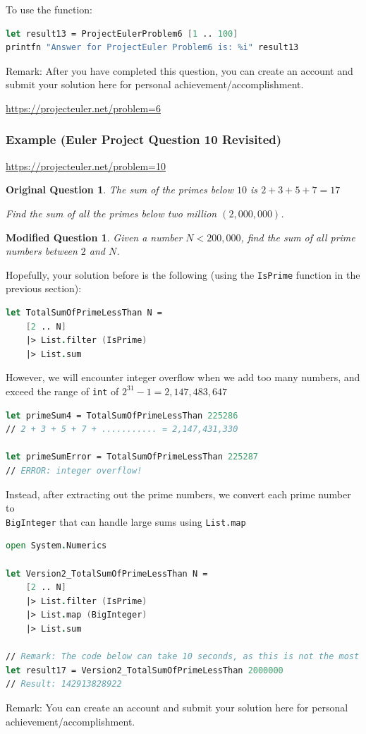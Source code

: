 \documentclass[12pt]{article}
\newtheorem*{modQuestion*}{Modified Question}
\newtheorem*{origQuestion*}{Original Question}
\begin{document}
To use the function:
\begin{lstlisting}[language=FSharp]
let result13 = ProjectEulerProblem6 [1 .. 100]
printfn "Answer for ProjectEuler Problem6 is: %i" result13
\end{lstlisting}
Remark: After you have completed this question, you can create an account and submit your solution here for personal achievement/accomplishment.

\url{https://projecteuler.net/problem=6}

\pagebreak

\subsubsection*{Example (Euler Project Question 10 Revisited)}

\url{https://projecteuler.net/problem=10}

\begin{origQuestion*}
The sum of the primes below $10$ is $2 + 3 + 5 + 7 = 17$

Find the sum of all the primes below two million $(2,000,000)$.
\end{origQuestion*}
\begin{modQuestion*}
Given a number $N < 200,000$, find the sum of all prime numbers between $2$ and $N$.
\end{modQuestion*}
Hopefully, your solution before is the following (using the \texttt{IsPrime} function in the previous section):
\begin{lstlisting}[language=FSharp]
let TotalSumOfPrimeLessThan N =
    [2 .. N]
    |> List.filter (IsPrime)
    |> List.sum
\end{lstlisting}
However, we will encounter integer overflow when we add too many numbers, and exceed the range of \texttt{int} of $2^{31} - 1 = 2,147,483,647$
\begin{lstlisting}[language=FSharp]
let primeSum4 = TotalSumOfPrimeLessThan 225286
// 2 + 3 + 5 + 7 + ........... = 2,147,431,330

let primeSumError = TotalSumOfPrimeLessThan 225287
// ERROR: integer overflow!
\end{lstlisting}
Instead, after extracting out the prime numbers, we convert each prime number to \\\texttt{BigInteger} that can handle large sums using \texttt{List.map}
\begin{lstlisting}[language=FSharp]
open System.Numerics

let Version2_TotalSumOfPrimeLessThan N =
    [2 .. N]
    |> List.filter (IsPrime)
    |> List.map (BigInteger)
    |> List.sum

// Remark: The code below can take 10 seconds, as this is not the most optimal algorithm.
let result17 = Version2_TotalSumOfPrimeLessThan 2000000
// Result: 142913828922
\end{lstlisting}
Remark: You can create an account and submit your solution here for personal achievement/accomplishment.
\end{document}
